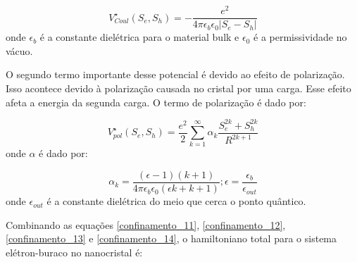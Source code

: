 	\begin{equation}
		\label{confinamento_12}
		V^{\star}_{Coul}(S_{e}, S_{h}) = -\frac{e^2}{4\pi\epsilon_{b}\epsilon_{0}|S_{e} - S_{h}|}
	\end{equation}
	onde $\epsilon_{b}$ é a constante dielétrica para o material bulk e $\epsilon_{0}$ é a permissividade no vácuo.

	\par O segundo termo importante desse potencial é devido ao efeito de polarização. Isso acontece devido à polarização causada no cristal por uma carga. Esse efeito afeta a energia da segunda carga. O termo de polarização é dado por:

	\begin{equation}
		\label{confinamento_13}
		V^{\star}_{pol}(S_{e}, S_{h}) = \frac{e^2}{2} \sum_{k=1}^{\infty} \alpha_{k}
			\frac{S_{e}^{2k} + S_{h}^{2k}}{R^{2k+1}}
	\end{equation}
	onde $\alpha$ é dado por:

	\begin{equation}
		\label{confinamento_14}
		\alpha_{k} = \frac{(\epsilon-1)(k+1)}{4\pi \epsilon_{b} \epsilon_{0}(\epsilon k + k + 1)}; \epsilon = \frac{\epsilon_{b}}{\epsilon_{out}}
	\end{equation}
	onde $\epsilon_{out}$ é a constante dielétrica do meio que cerca o ponto quântico.

	\par Combinando as equações \eqref{confinamento_11}, \eqref{confinamento_12}, \eqref{confinamento_13} e \eqref{confinamento_14}, o hamiltoniano total para o sistema elétron-buraco no nanocristal é:


